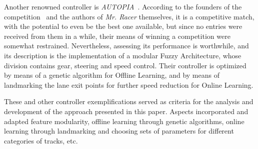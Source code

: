 		Another renowned controller is \emph{AUTOPIA}~\cite{AUTOPIA}. According to the founders of the
		competition~\cite{SoA} and the authors of \emph{Mr. Racer} themselves, it is a competitive match, with the
		potential to even be the best one available, but since no entries were received from them in a while, their
		means of winning a competition were somewhat restrained. Nevertheless, assessing its performance is
		worthwhile, and its description is the implementation of a modular Fuzzy Architecture, whose division contains
		gear, steering and speed control. Their controller is optimized by means of a genetic algorithm for Offline
		Learning, and by means of landmarking the lane exit points for further speed reduction for Online Learning.
		
		These and other controller exemplifications served as criteria for the analysis and development of the
		approach presented in this paper. Aspects incorporated and adapted feature modularity, offline learning
		through genetic algorithms, online learning through landmarking and choosing sets of parameters for different
		categories of tracks, etc. 